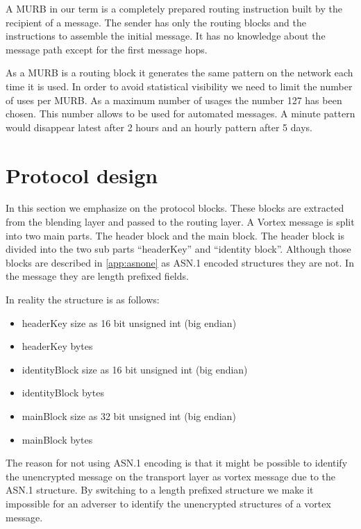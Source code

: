 A MURB in our term is a completely prepared routing instruction built by the recipient of a message. The sender has only the routing blocks and the instructions to assemble the initial message. It has no knowledge about the message path except for the first message hops.

As a MURB is a routing block it generates the same pattern on the network each time it is used. In order to avoid statistical visibility we need to limit the number of uses per MURB. As a maximum number of usages the number 127 has been chosen. This number allows to be used for automated messages. A minute pattern would disappear latest after 2 hours and an hourly pattern after 5 days.


\section{Protocol design}
In this section we emphasize on the protocol blocks. These blocks are extracted from the blending layer and passed to the routing layer. A Vortex message is split into two main parts. The header block and the main block. The header block is divided into the two sub parts ``headerKey'' and ``identity block''. Although those blocks are described in \ref{app:asnone} as ASN.1 encoded structures they are not. In the message they are length prefixed fields.

In reality the structure is as follows:
\begin{itemize}
	\item headerKey size as 16 bit unsigned int (big endian)
	\item headerKey bytes
	\item identityBlock size as 16 bit unsigned int (big endian)
	\item identityBlock bytes
	\item mainBlock size as 32 bit unsigned int (big endian)
	\item mainBlock bytes
\end{itemize}
The reason for not using ASN.1 encoding is that it might be possible to identify the unencrypted message on the transport layer as vortex message due to the ASN.1 structure. By switching to a length prefixed structure we make it impossible for an adverser to identify the unencrypted structures of a vortex message.



